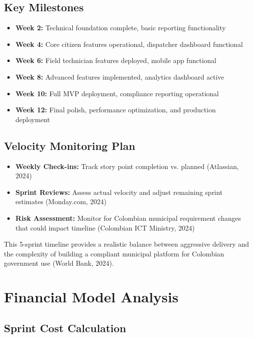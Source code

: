 \documentclass[12pt,a4paper]{article}
\begin{document}
\subsection{Key Milestones}

\begin{itemize}
    \item \textbf{Week 2:} Technical foundation complete, basic reporting functionality
    \item \textbf{Week 4:} Core citizen features operational, dispatcher dashboard functional
    \item \textbf{Week 6:} Field technician features deployed, mobile app functional
    \item \textbf{Week 8:} Advanced features implemented, analytics dashboard active
    \item \textbf{Week 10:} Full MVP deployment, compliance reporting operational
    \item \textbf{Week 12:} Final polish, performance optimization, and production deployment
\end{itemize}

\subsection{Velocity Monitoring Plan}

\begin{itemize}
    \item \textbf{Weekly Check-ins:} Track story point completion vs. planned (Atlassian, 2024)
    \item \textbf{Sprint Reviews:} Assess actual velocity and adjust remaining sprint estimates (Monday.com, 2024)
    \item \textbf{Risk Assessment:} Monitor for Colombian municipal requirement changes that could impact timeline (Colombian ICT Ministry, 2024)
\end{itemize}

This 5-sprint timeline provides a realistic balance between aggressive delivery and the complexity of building a compliant municipal platform for Colombian government use (World Bank, 2024).

\section{Financial Model Analysis}

\subsection{Sprint Cost Calculation}
\end{document}
